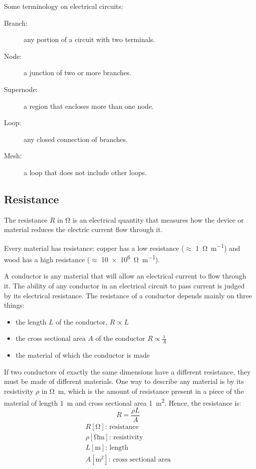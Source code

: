 \documentclass[10pt, twocolumn]{article}
\begin{document}
Some terminology on electrical circuits:
\begin{description}
  \item[Branch:] any portion of a circuit with two terminals.
  \item[Node:] a junction of two or more branches.
  \item[Supernode:] a region that encloses more than one node.
  \item[Loop:] any closed connection of branches.
  \item[Mesh:] a loop that does not include other loops.
\end{description}


\subsection{Resistance}
The resistance \(R\) in \si{\ohm} is an electrical quantity that measures how the device or material reduces the electric current flow through it.

\begin{remark}
  Every material has resistance: copper has a low resistance (\(\approx\) \SI{1}{\ohm\per\metre}) and wood has a high resistance (\(\approx\) \SI{10e+6}{\ohm\per\metre}).
\end{remark}

A conductor is any material that will allow an electrical current to flow through it.
The ability of any conductor in an electrical circuit to pass current is judged by its electrical resistance.
The resistance of a conductor depends mainly on three things:
\begin{itemize}
  \item the length \(L\) of the conductor, \(R \propto L\)
  \item the cross sectional area \(A\) of the conductor \(R \propto \frac{1}{A}\)
  \item the material of which the conductor is made
\end{itemize}

If two conductors of exactly the same dimensions have a different resistance, they must be made of different materials.
One way to describe any material is by its resistivity \(\rho\) in \si{\ohm\metre}, which is the amount of resistance present in a piece of the material of length \SI{1}{\metre} and cross sectional area \SI{1}{\metre\squared}.
Hence, the resistance is:
\[
  R = \frac{\rho L}{A}
\]
\[
  \begin{array}{|l}
    R [\si{\ohm}] \text{: resistance}           \\
    \rho [\si{\ohm\metre}] \text{: resistivity} \\
    L [\si{\metre}] \text{: length}             \\
    A [\si{\metre\squared}] \text{: cross sectional area}
  \end{array}
\]
\end{document}
